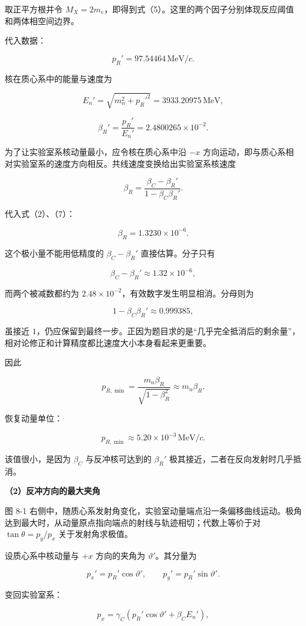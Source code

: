 \documentclass[12pt,a4paper,UTF8]{ctexart}
\begin{document}
取正平方根并令
\(M_X=2m_e\)，即得到式（5）。这里的两个因子分别体现反应阈值和两体相空间边界。

代入数据：

\[p_R'=97.54464\,\mathrm{MeV}/c. \tag{6}\]

核在质心系中的能量与速度为

\[E_n'=\sqrt{m_n^2+p_R'^2}
=3933.20975\,\mathrm{MeV},\]

\[\beta_R'=\frac{p_R'}{E_n'}
=2.4800265\times10^{-2}. \tag{7}\]

为了让实验室系核动量最小，应令核在质心系中沿 \(-x\)
方向运动，即与质心系相对实验室系的速度方向相反。共线速度变换给出实验室系核速度

\[\beta_R=\frac{\beta_C-\beta_R'}{1-\beta_C\beta_R'}. \tag{8}\]

代入式（2）、（7）：

\[\beta_R=1.3230\times10^{-6}. \tag{9}\]

这个极小量不能用低精度的 \(\beta_C-\beta_R'\) 直接估算。分子只有

\[\beta_C-\beta_R'
\approx1.32\times10^{-6},\]

而两个被减数都约为 \(2.48\times10^{-2}\)，有效数字发生明显相消。分母则为

\[1-\beta_C\beta_R'\approx0.999385,\]

虽接近
\(1\)，仍应保留到最终一步。正因为题目求的是``几乎完全抵消后的剩余量''，相对论修正和计算精度都比速度大小本身看起来更重要。

因此

\[p_{R,\min}
=\frac{m_n\beta_R}{\sqrt{1-\beta_R^2}}
\approx m_n\beta_R.\]

恢复动量单位：

\[\boxed{
p_{R,\min}\approx5.20\times10^{-3}\,\mathrm{MeV}/c
}. \tag{10}\]

该值很小，是因为 \(\beta_C\) 与反冲核可达到的 \(\beta_R'\)
极其接近，二者在反向发射时几乎抵消。

\textbf{（2）反冲方向的最大夹角}

图 8-1
右侧中，随质心系发射角变化，实验室动量端点沿一条偏移曲线运动。极角达到最大时，从动量原点指向端点的射线与轨迹相切；代数上等价于对
\(\tan\theta=p_y/p_x\) 关于发射角求极值。

设质心系中核动量与 \(+x\) 方向的夹角为 \(\vartheta'\)。其分量为

\[p_x'=p_R'\cos\vartheta',\qquad
p_y'=p_R'\sin\vartheta'.\]

变回实验室系：

\[p_x=\gamma_C(p_R'\cos\vartheta'+\beta_CE_n'),\]
\end{document}
